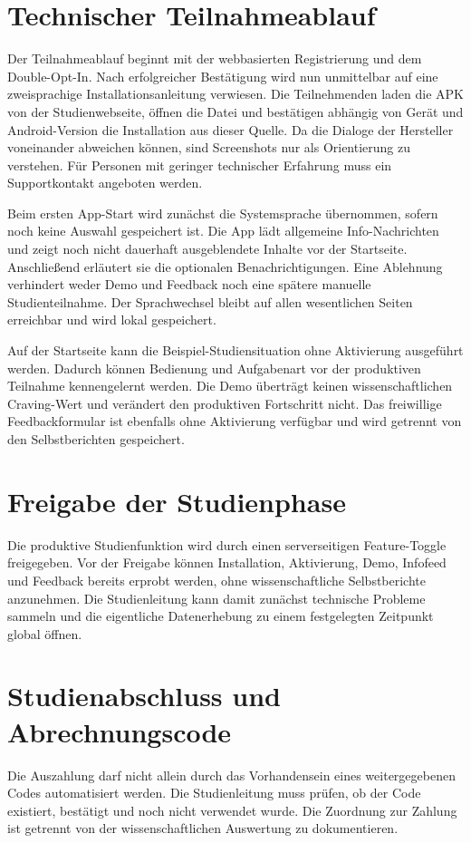 
\section{Technischer Teilnahmeablauf}

Der Teilnahmeablauf beginnt mit der webbasierten Registrierung und dem Double-Opt-In. Nach erfolgreicher Bestätigung wird nun unmittelbar auf eine zweisprachige Installationsanleitung verwiesen. Die Teilnehmenden laden die APK von der Studienwebseite, öffnen die Datei und bestätigen abhängig von Gerät und Android-Version die Installation aus dieser Quelle. Da die Dialoge der Hersteller voneinander abweichen können, sind Screenshots nur als Orientierung zu verstehen. Für Personen mit geringer technischer Erfahrung muss ein Supportkontakt angeboten werden.

Beim ersten App-Start wird zunächst die Systemsprache übernommen, sofern noch keine Auswahl gespeichert ist. Die App lädt allgemeine Info-Nachrichten und zeigt noch nicht dauerhaft ausgeblendete Inhalte vor der Startseite. Anschließend erläutert sie die optionalen Benachrichtigungen. Eine Ablehnung verhindert weder Demo und Feedback noch eine spätere manuelle Studienteilnahme. Der Sprachwechsel bleibt auf allen wesentlichen Seiten erreichbar und wird lokal gespeichert.

Auf der Startseite kann die Beispiel-Studiensituation ohne Aktivierung ausgeführt werden. Dadurch können Bedienung und Aufgabenart vor der produktiven Teilnahme kennengelernt werden. Die Demo überträgt keinen wissenschaftlichen Craving-Wert und verändert den produktiven Fortschritt nicht. Das freiwillige Feedbackformular ist ebenfalls ohne Aktivierung verfügbar und wird getrennt von den Selbstberichten gespeichert.

\section{Freigabe der Studienphase}
Die produktive Studienfunktion wird durch einen serverseitigen Feature-Toggle freigegeben. Vor der Freigabe können Installation, Aktivierung, Demo, Infofeed und Feedback bereits erprobt werden, ohne wissenschaftliche Selbstberichte anzunehmen. Die Studienleitung kann damit zunächst technische Probleme sammeln und die eigentliche Datenerhebung zu einem festgelegten Zeitpunkt global öffnen.

\section{Studienabschluss und Abrechnungscode}
Die Auszahlung darf nicht allein durch das Vorhandensein eines weitergegebenen Codes automatisiert werden. Die Studienleitung muss prüfen, ob der Code existiert, bestätigt und noch nicht verwendet wurde. Die Zuordnung zur Zahlung ist getrennt von der wissenschaftlichen Auswertung zu dokumentieren.

